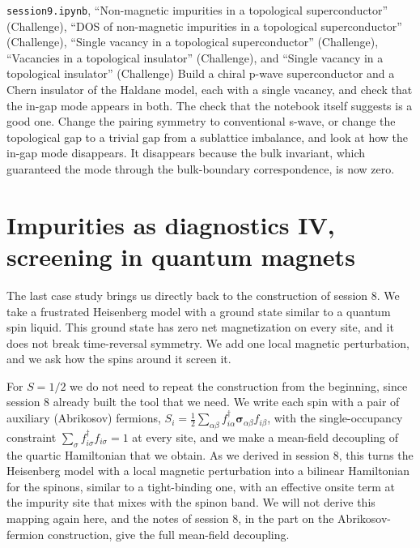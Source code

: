 \begin{notebookbox}{\texttt{session9.ipynb}, ``Non-magnetic impurities in a topological superconductor'' (Challenge), ``DOS of non-magnetic impurities in a topological superconductor'' (Challenge), ``Single vacancy in a topological superconductor'' (Challenge), ``Vacancies in a topological insulator'' (Challenge), and ``Single vacancy in a topological insulator'' (Challenge)}
Build a chiral p-wave superconductor and a Chern insulator of the Haldane model, each with a single
vacancy, and check that the in-gap mode appears in both. The check that the notebook itself suggests
is a good one. Change the pairing symmetry to conventional s-wave, or change the topological gap to a
trivial gap from a sublattice imbalance, and look at how the in-gap mode disappears. It disappears
because the bulk invariant, which guaranteed the mode through the bulk-boundary correspondence, is
now zero.
\end{notebookbox}

\section{Impurities as diagnostics IV, screening in quantum magnets}

The last case study brings us directly back to the construction of session 8. We take a frustrated
Heisenberg model with a ground state similar to a quantum spin liquid. This ground state has zero net
magnetization on every site, and it does not break time-reversal symmetry. We add one local magnetic
perturbation, and we ask how the spins around it screen it.

For $S=1/2$ we do not need to repeat the construction from the beginning, since session 8 already
built the tool that we need. We write each spin with a pair of auxiliary (Abrikosov) fermions,
$S_i =
\tfrac{1}{2}\sum_{\alpha\beta} f_{i\alpha}^\dagger \boldsymbol{\sigma}_{\alpha\beta} f_{i\beta}$,
with the single-occupancy constraint $\sum_\sigma f_{i\sigma}^\dagger f_{i\sigma} = 1$ at every
site, and we make a mean-field decoupling of the quartic Hamiltonian that we obtain. As we derived in
session 8, this turns the Heisenberg model with a local magnetic perturbation into a bilinear
Hamiltonian for the spinons, similar to a tight-binding one, with an effective onsite term at the
impurity site that mixes with the spinon band. We will not derive this mapping again here, and the
notes of session 8, in the part on the Abrikosov-fermion construction, give the full mean-field
decoupling.

